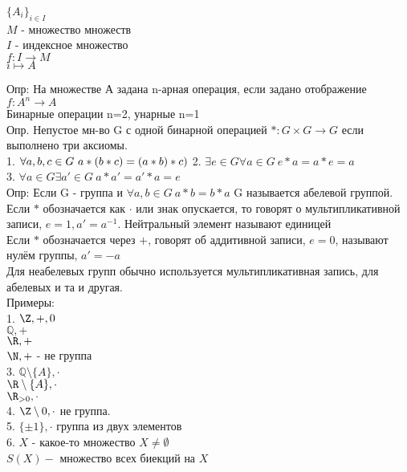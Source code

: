\noindent
$\{A_i\}_{i\in I}$ \\
$ M $ - множество множеств \\
$ I $ - индексное множество \\
$ f: I \rightarrow M $ \\
$ i \mapsto A $



Опр: На множестве А задана n-арная операция, если задано отображение $ f: A^n \rightarrow A $\\
Бинарные операции n=2, унарные n=1 \\
Опр. Непустое мн-во G с одной бинарной операцией $ * : G \times G \rightarrow G $ если выполнено три аксиомы. \\
1. $ \forall a,b,c \in G \ a * (b * c) = (a *b) * c) \\$
2. $ \exists e \in G \forall a \in G \ e*a=a*e=a $ \\
3. $ \forall a \in G \exists a' \in G \ a*a'=a'*a=e$ \\
Опр: Если G - группа и $ \forall a,b \in G \ a*b=b*a $ G называется абелевой группой. \\
Если $*$ обозначается как $ \cdot$ или знак опускается, то говорят о мультипликативной записи, $e = 1, a' = a^{-1} $. Нейтральный элемент называют единицей\\
Если $*$ обозначается через $+$, говорят об аддитивной записи, $ e=0$, называют нулём группы, $ a' = -a$\\
Для неабелевых групп обычно  используется мультипликативная запись, для абелевых и та и другая. \\
Примеры: \\
1. $ \Z, +, 0 $ \\
$ \mathbb{Q}, + $ \\
$ \R, + $ \\
$ \N, + $ - не группа \\
3. $\mathbb{Q} \setminus \{A\}, \cdot $\\
$\R \setminus \{A\}, \cdot $\\
$\R_{> 0}, \cdot $\\
4. $ \Z \setminus 0, \cdot $ не группа. \\
5. $ \{ \pm 1 \}, \cdot $ группа из двух элементов \\
6. $ X$ - какое-то множество $ X \neq \emptyset $\\
$ S(X) -$ множество всех биекций на $X$\\
